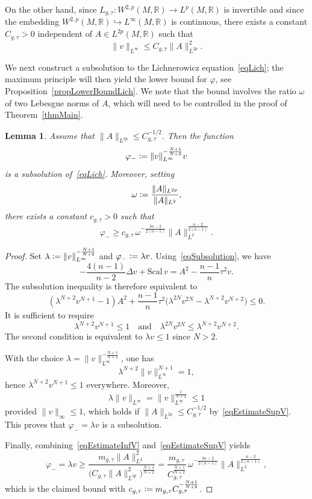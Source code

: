 \documentclass[a4paper, 10pt, reqno]{amsart}
\theoremstyle{plain}
\newtheorem{lemma}[thm]{Lemma}
\theoremstyle{remark}
\theoremstyle{definition}
\renewcommand{\phi}{\varphi}
\newcommand{\bR}{\mathbb{R}}
\newcommand{\definedas}{\mathrel{\raise.095ex\hbox{\rm :}\mkern-5.2mu=}}
\newcommand{\scal}{\mathrm{Scal}}
\begin{document}
On the other hand, since $L_{g, \tau}: W^{2, p}(M, \bR) \to L^p(M, \bR)$ is
invertible and since the embedding $W^{2, p}(M, \bR) \hookrightarrow
    L^\infty(M, \bR)$ is continuous, there exists a constant $C_{g, \tau} > 0$
independent of $A \in L^{2p}(M, \bR)$ such that
\begin{equation}\label{eqEstimateSupV}
    \|v\|_{L^\infty} \leq C_{g, \tau} \|A\|_{L^{2p}}^2.
\end{equation}

We next construct a subsolution to the Lichnerowicz equation~\eqref{eqLich};
the maximum principle will then yield the lower bound for $\phi$, see
Proposition~\ref{propLowerBoundLich}. We note that the bound involves the ratio
$\omega$ of two Lebesgue norms of $A$, which will need to be controlled in the
proof of Theorem~\ref{thmMain}.

\begin{lemma}\label{lmSubsolution}
    Assume that $\|A\|_{L^{2p}} \le C_{g,\tau}^{-1/2}$. Then the function
    \[
        \phi_- \definedas \|v\|_{L^\infty}^{-\frac{N+1}{N+2}} v
    \]
    is a subsolution of~\eqref{eqLich}. Moreover, setting
    \[
        \omega \definedas \frac{\|A\|_{L^{2p}}}{\|A\|_{L^2}},
    \]
    there exists a constant $c_{g,\tau} > 0$ such that
    \[
        \phi_- \ge c_{g,\tau}\,
        \omega^{-\frac{3n-2}{2(n-1)}} \|A\|_{L^2}^{\frac{n-2}{2(n-1)}}.
    \]
\end{lemma}

\begin{proof}
    Set $\lambda \definedas \|v\|_{L^\infty}^{-\frac{N+1}{N+2}}$ and $\phi_- \definedas \lambda v$.
    Using~\eqref{eqSubsolution}, we have
    \[
        -\frac{4(n-1)}{n-2}\Delta v+\scal\,v = A^2 - \frac{n-1}{n}\tau^2 v.
    \]
    The subsolution inequality is therefore equivalent to
    \[
        (\lambda^{N+2}v^{N+1}-1)A^2
        +\frac{n-1}{n}\tau^2\bigl(\lambda^{2N}v^{2N}-\lambda^{N+2}v^{N+2}\bigr)\le 0.
    \]
    It is sufficient to require
    \[
        \lambda^{N+2}v^{N+1}\le 1
        \quad\text{and}\quad
        \lambda^{2N}v^{2N}\le \lambda^{N+2}v^{N+2}.
    \]
    The second condition is equivalent to $\lambda v\le 1$ since $N>2$.

    With the choice $\lambda=\|v\|_{L^\infty}^{-\frac{N+1}{N+2}}$, one has
    \[
        \lambda^{N+2}\|v\|_{L^\infty}^{N+1}=1,
    \]
    hence $\lambda^{N+2}v^{N+1}\le 1$ everywhere. Moreover,
    \[
        \lambda\|v\|_{L^\infty} = \|v\|_{L^\infty}^{\frac{1}{N+2}}\le 1
    \]
    provided $\|v\|_\infty\le 1$, which holds if $\|A\|_{L^{2p}} \le
        C_{g,\tau}^{-1/2}$ by~\eqref{eqEstimateSupV}. This proves that $\phi_-=\lambda
        v$ is a subsolution.

    Finally, combining~\eqref{eqEstimateInfV} and~\eqref{eqEstimateSupV} yields
    \[
        \phi_- = \lambda v
        \ge
        \frac{m_{g,\tau}\|A\|_{L^2}^2}{\bigl(C_{g,\tau}\|A\|_{L^{2p}}^2\bigr)^{\frac{N+1}{N+2}}}
        =
        \frac{m_{g,\tau}}{C_{g,\tau}^{\frac{N+1}{N+2}}}\,
        \omega^{-\frac{3n-2}{2(n-1)}} \|A\|_{L^2}^{\frac{n-2}{2(n-1)}},
    \]
    which is the claimed bound with $c_{g,\tau} \definedas m_{g,\tau}
        C_{g,\tau}^{-\frac{N+1}{N+2}}$.
\end{proof}
\end{document}
